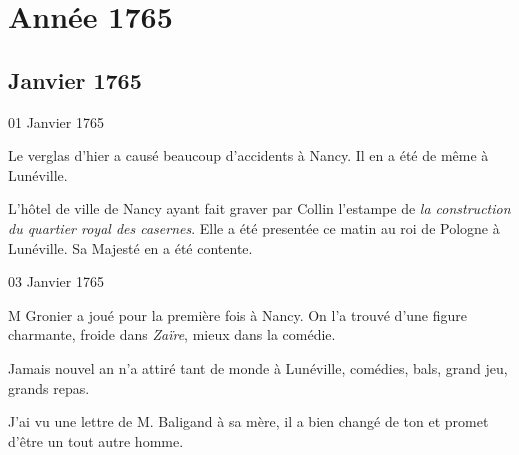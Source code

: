 
               \part*{Année 1765}\chapter*{Janvier 1765}
                     
                     
                     
                     \begin{diary}{01 Janvier 1765}{}
                        
                         Le verglas d'hier a causé beaucoup d'accidents
                           à Nancy. Il en a été de même
                           à Lunéville. \bigskip
        
        
                        
                           L'hôtel de ville de Nancy
                           ayant fait graver par
                           Collin l'estampe de \emph{la construction du quartier
                              royal des casernes}.
                           Elle a été presentée ce matin
                           au roi de Pologne à
                              Lunéville. Sa Majesté en a été contente. \bigskip
        
        
                     \end{diary}

                     \begin{diary}{03 Janvier 1765}{}
                        
                        
                           M
                              Gronier a joué pour la première fois à
                           Nancy. On l'a trouvé d'une
                           figure charmante,
                           froide dans \emph{Zaïre}, mieux dans la
                           comédie. \bigskip
        
        
                         Jamais nouvel an n'a attiré tant de
                           monde à
                           Lunéville, comédies,
                           bals, grand jeu, grands repas. \bigskip
        
        
                         J'ai vu une lettre de M. Baligand à sa mère,
                           il a bien changé de ton et promet d'être un
                           tout autre homme. \bigskip
        
        
                     \end{diary}

